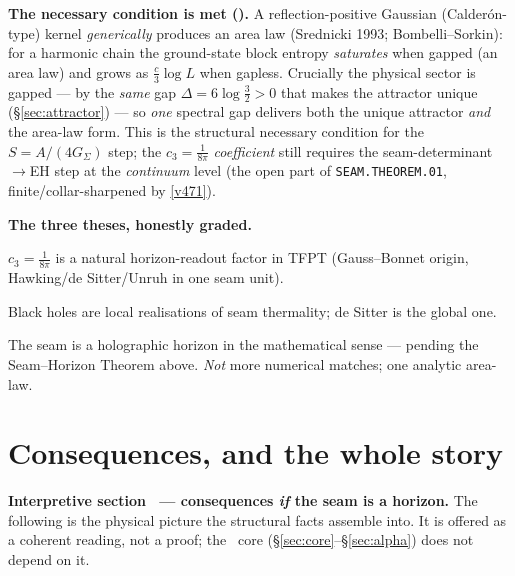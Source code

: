 \documentclass[11pt,a4paper]{article}
\newcommand{\cthree}{c_3}
\begin{document}
\begin{gapbox}
\smallskip\noindent\textbf{The necessary condition is met ().} A
reflection-positive Gaussian (Calder\'on-type) kernel \emph{generically} produces an area law
(Srednicki 1993; Bombelli--Sorkin): for a harmonic chain the ground-state block entropy \emph{saturates}
when gapped (an area law) and grows as $\tfrac c3\log L$ when gapless. Crucially the physical sector is
gapped --- by the \emph{same} gap $\Delta=6\log\tfrac32>0$ that makes the attractor unique
(\S\ref{sec:attractor}) --- so \emph{one} spectral gap delivers both the unique attractor \emph{and} the
area-law form. This is the structural necessary condition for the $S=A/(4G_\Sigma)$ step; the
$\cthree=\tfrac1{8\pi}$ \emph{coefficient} still requires the seam-determinant$\to$EH step at the
\emph{continuum} level (the open part of \texttt{SEAM.THEOREM.01}, finite/collar-sharpened by \vref{v471}).
\end{gapbox}

\par\smallskip\noindent\textbf{The three theses, honestly graded.}
\begin{description}[leftmargin=2.0em,style=nextline]
\item[\textnormal{Weak \mE\ (established).}] $\cthree=\tfrac1{8\pi}$ is a natural horizon-readout factor in TFPT (Gauss--Bonnet origin, Hawking/de Sitter/Unruh in one seam unit).
\item[\textnormal{Medium \mC\ (very plausible).}] Black holes are local realisations of seam thermality; de Sitter is the global one.
\item[\textnormal{Strong \mO\ (open, right direction).}] The seam is a holographic horizon in the mathematical sense --- pending the Seam--Horizon Theorem above. \emph{Not} more numerical matches; one analytic area-law.
\end{description}

\section{Consequences, and the whole story \mC}\label{sec:consequences}
\par\smallskip\noindent\textbf{Interpretive section \mC\ --- consequences \emph{if} the seam is a horizon.}
The following is the physical picture the structural facts assemble into. It is offered as a coherent
reading, not a proof; the \mE\ core (\S\ref{sec:core}--\S\ref{sec:alpha}) does not depend on it.
\par\smallskip
\end{document}
